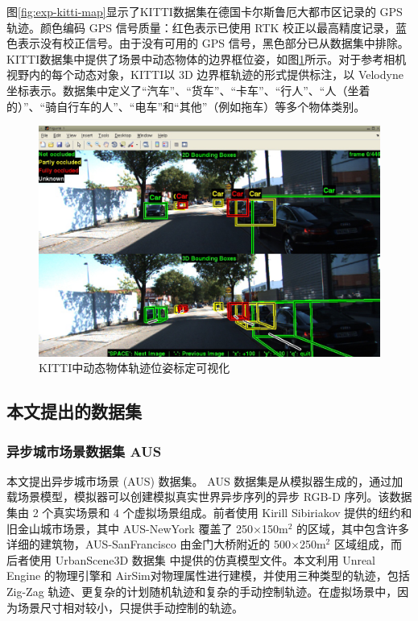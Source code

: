 图\ref{fig:exp-kitti-map}显示了KITTI数据集在德国卡尔斯鲁厄大都市区记录的 GPS 轨迹。颜色编码 GPS 信号质量：红色表示已使用 RTK 校正以最高精度记录，蓝色表示没有校正信号。由于没有可用的 GPS 信号，黑色部分已从数据集中排除。
KITTI数据集中提供了场景中动态物体的边界框位姿，如图\ref{fig:exp-kitti-objpose}所示。对于参考相机视野内的每个动态对象，KITTI以 3D 边界框轨迹的形式提供标注，以 Velodyne 坐标表示。数据集中定义了“汽车”、“货车”、“卡车”、“行人”、“人（坐着的）”、“骑自行车的人”、“电车”和“其他”（例如拖车）等多个物体类别。

\begin{figure}[ht]
    \centering
    \includegraphics[width=\textwidth]{undergraduate-thesis/images/experiments/kitti-objects.png}
    \caption{KITTI中动态物体轨迹位姿标定可视化}
    \label{fig:exp-kitti-objpose}
\end{figure}



\subsection{本文提出的数据集}
\subsubsection{异步城市场景数据集 AUS}
本文提出异步城市场景 (AUS) 数据集。 AUS 数据集是从模拟器生成的，通过加载场景模型，模拟器可以创建模拟真实世界异步序列的异步 RGB-D 序列。该数据集由 2 个真实场景和 4 个虚拟场景组成。前者使用 Kirill Sibiriakov \cite{ArtStation}提供的纽约和旧金山城市场景，其中 AUS-NewYork 覆盖了 250×150m$^2$ 的区域，其中包含许多详细的建筑物，AUS-SanFrancisco 由金门大桥附近的 500×250m$^2$ 区域组成，而后者使用 UrbanScene3D 数据集 \cite{lin_capturing_2022} 中提供的仿真模型文件。本文利用 Unreal Engine 的物理引擎和 AirSim\cite{shah_airsim_2017}对物理属性进行建模，并使用三种类型的轨迹，包括 Zig-Zag 轨迹、更复杂的计划随机轨迹和复杂的手动控制轨迹。在虚拟场景中，因为场景尺寸相对较小，只提供手动控制的轨迹。

